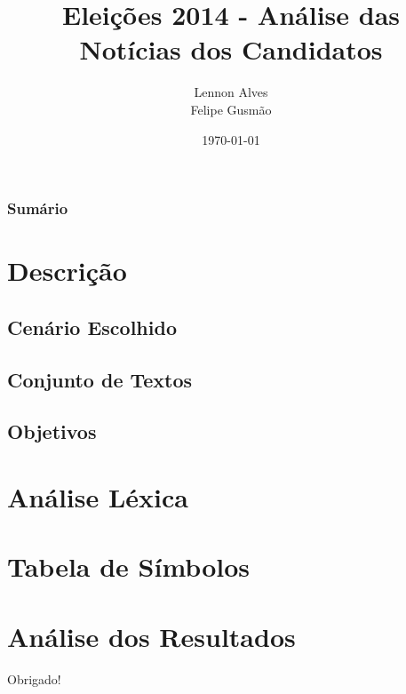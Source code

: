 \documentclass{beamer}
\title[Atividade Extra 02]{Eleições 2014 - Análise das Notícias dos Candidatos}
\author{Lennon Alves \\ Felipe Gusmão}
\institute[UTFPR]
{
Universidade Tecnológica Federal do Paraná \\ 
\medskip
\textit{Compiladores}
}
\date{\today}
\begin{document}
\begin{frame}
\titlepage
\end{frame}



\begin{frame}
\frametitle{Sumário}
\tableofcontents

\section{Descrição}
\subsection{Cenário Escolhido}
\subsection{Conjunto de Textos}
\subsection{Objetivos}
\section{Análise Léxica}
\section{Tabela de Símbolos}
\section{Análise dos Resultados}

\end{frame}




\begin{frame}
\Huge{\centerline{Obrigado!}}
\end{frame}

\end{document}
